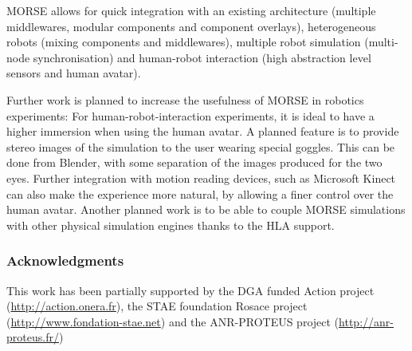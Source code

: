 \documentclass{llncs}
\begin{document}
MORSE allows for quick integration with an existing architecture (multiple
middlewares, modular components and component overlays), heterogeneous robots
(mixing components and middlewares), multiple robot simulation (multi-node
synchronisation) and human-robot interaction (high abstraction level sensors
and human avatar).

Further work is planned to increase the usefulness of MORSE in robotics
experiments:
For human-robot-interaction experiments, it is ideal to have a higher
immersion when using the human avatar.  A planned feature is to provide stereo
images of the simulation to the user wearing special goggles. This can be done
from Blender, with some separation of the images produced for the two eyes.
Further integration with motion reading devices, such as Microsoft Kinect can
also make the experience more natural, by allowing a finer control over the
human avatar.
Another planned work is to be able to couple MORSE simulations with
other physical simulation engines thanks to the HLA support.

\subsubsection*{Acknowledgments}
This work has been partially supported by the DGA funded Action project
(\url{http://action.onera.fr}), the STAE foundation Rosace project
(\url{http://www.fondation-stae.net}) and the ANR-PROTEUS
project (\url{http://anr-proteus.fr/})

% 


\end{document}

